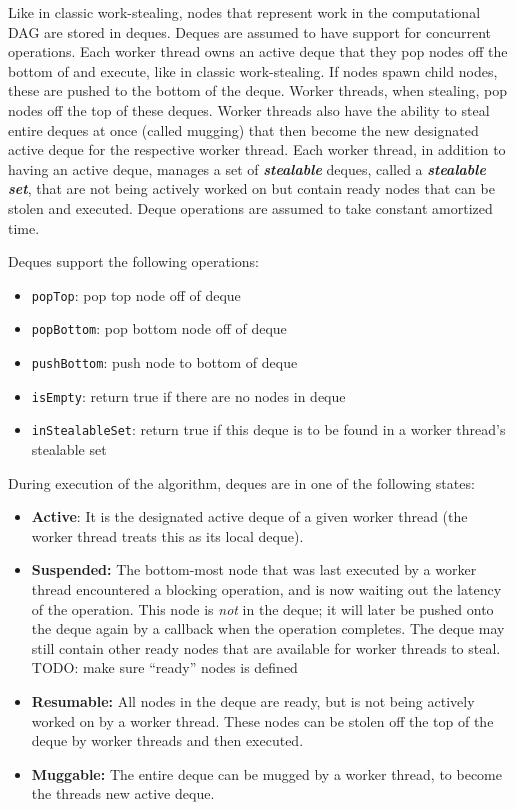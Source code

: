 \documentclass[bsc,frontabs,singlespacing,parskip,deptreport,normalheadings]{infthesis}
\begin{document}
Like in classic work-stealing, nodes that represent work in the computational
DAG are stored in deques. Deques are assumed to have support for concurrent
operations. Each worker thread owns an active deque that they pop nodes off the
bottom of and execute, like in classic work-stealing. If nodes spawn child
nodes, these are pushed to the bottom of the deque. Worker threads, when
stealing, pop nodes off the top of these deques. Worker threads also have the
ability to steal entire deques at once (called mugging) that then become the new
designated active deque for the respective worker thread. Each worker thread, in
addition to having an active deque, manages a set of \textbf{\textit{stealable}}
deques, called a \textbf{\textit{stealable set}}, that are not being actively
worked on but contain ready nodes that can be stolen and executed. Deque
operations are assumed to take constant amortized time.

Deques support the following operations:

\begin{itemize}
    \item \texttt{popTop}: pop top node off of deque
    \item \texttt{popBottom}: pop bottom node off of deque
    \item \texttt{pushBottom}: push node to bottom of deque
    \item \texttt{isEmpty}: return true if there are no nodes in deque
    \item \texttt{inStealableSet}: return true if this deque is to be found in a
        worker thread's stealable set
\end{itemize}

During execution of the algorithm, deques are in one of the following states:

\begin{itemize}
    \item \textbf{Active}: It is the designated active deque of a given worker
        thread (the worker thread treats this as its local deque).
    \item \textbf{Suspended:} The bottom-most node that was last executed by a
        worker thread encountered a blocking operation, and is now waiting out
        the latency of the operation. This node is \textit{not} in the deque; it
        will later be pushed onto the deque again by a callback when the
        operation completes. The deque may still contain other ready nodes that
        are available for worker threads to steal. TODO: make sure ``ready''
        nodes is defined
    \item \textbf{Resumable:} All nodes in the deque are ready, but is not being
        actively worked on by a worker thread. These nodes can be stolen off the
        top of the deque by worker threads and then executed.
    \item \textbf{Muggable:} The entire deque can be mugged by a worker thread,
        to become the threads new active deque.
\end{itemize}
\end{document}

